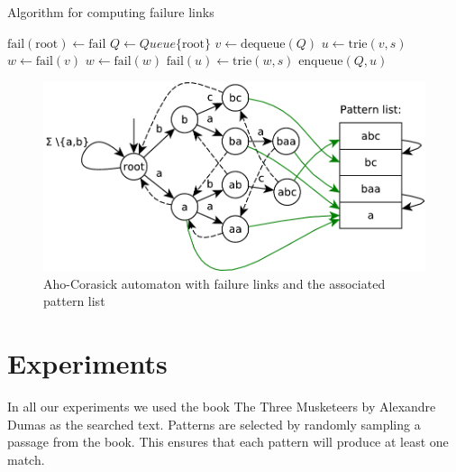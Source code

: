 \documentclass[final]{beamer}
\begin{document}
\begin{poster}
\begin{algorithm} [H]
\small
\caption{Algorithm for computing failure links}
\label{alg:ac_fail}

\begin{algorithmic}[1]
\State $ \text{fail}(\text{root}) \gets \text{fail}$
\State $Q \gets Queue\{\text{root}\}$
    \State $v \gets \text{dequeue}(Q) $
        \State $u \gets \text{trie}(v,s)$ 
        \State $w \gets \text{fail}(v)$ 
            \State $w \gets \text{fail}(w)$ 
        \EndWhile
        \State $ \text{fail}(u) \gets \text{trie}(w,s)$
        \State $\text{enqueue}(Q,u)$
    \EndFor
\EndWhile
\end{algorithmic}
\end{algorithm}

%

\begin{figure}
\label{fig:ac_machine}
\centering
 \includegraphics[width=23cm]{aho_corasick.pdf}
\caption{Aho-Corasick automaton with failure links and the associated pattern list}
\end{figure}

\section{Experiments}
In all our experiments we used the book The Three Musketeers by Alexandre Dumas as the
searched text.
Patterns are selected by randomly sampling a passage from the book.
This ensures that each pattern will produce at least one match.


\end{poster}
\end{document}
